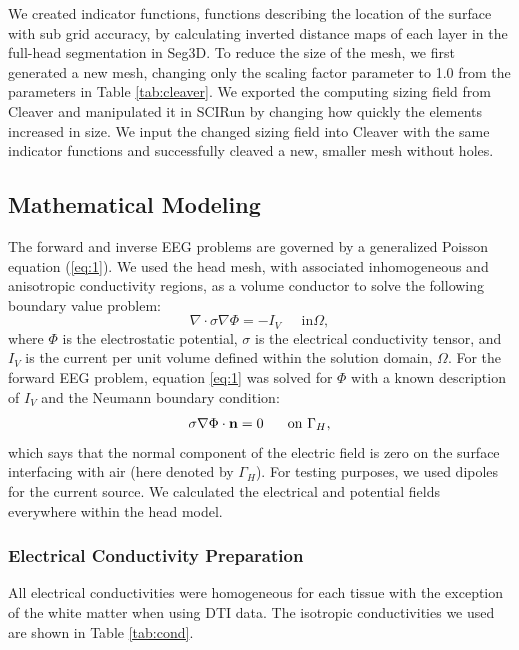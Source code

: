 We created indicator functions, functions describing the location of the surface with sub grid accuracy, by calculating inverted distance maps of each layer in the full-head segmentation in Seg3D. To reduce the size of the mesh, we first generated a new mesh, changing only the scaling factor parameter to 1.0 from the parameters in Table \ref{tab:cleaver}. We exported the computing sizing field from Cleaver and manipulated it in SCIRun by changing how quickly the elements increased in size. We input the changed sizing field into Cleaver with the same indicator functions and successfully cleaved a new, smaller mesh without holes.

\subsection{Mathematical Modeling}
\label{sec:math}


The forward and inverse EEG problems are governed by a generalized Poisson equation (\ref{eq:1}). We used the head mesh, with associated inhomogeneous and anisotropic conductivity regions, as a volume conductor to solve the following boundary value problem:
%
\begin{equation}
\label{eq:1} \nabla\cdot\sigma\nabla\Phi = -I_{V} \;\;\;\;\mbox{ in
}\Omega,
\end{equation} 
%
where $\Phi$ is the electrostatic potential, $\sigma$ is the electrical conductivity tensor, and $I_{V}$ is the current per unit volume defined within the solution domain, $\Omega$. For the forward EEG problem, equation \ref{eq:1} was solved for $\Phi$ with a known description of $I_{V}$ and the Neumann boundary condition:
%
\begin{equation} \sigma\nabla\Phi\cdot{\bf
n} = 0\;\;\;\;\;\mbox{ on }\Gamma_{H}, 
\end{equation} 
%
which says that the normal component of the electric field is zero on the surface interfacing with air (here denoted by $\Gamma_{H}$). For testing purposes, we used dipoles for the current source. We calculated the electrical and potential fields everywhere within the head model. \cite{SCI:Joh2015c}

\subsubsection{Electrical Conductivity Preparation}
\label{sec:cond}

All electrical conductivities were homogeneous for each tissue with the exception of the white matter when using DTI data. The isotropic conductivities \cite{ref:cond} we used are shown in Table \ref{tab:cond}.

